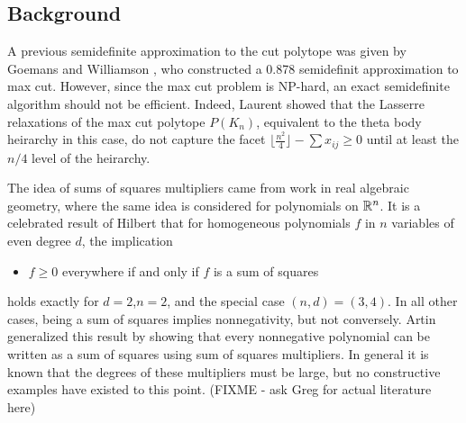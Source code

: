 \subsection{Background}
A previous semidefinite approximation to the cut polytope was given by Goemans and Williamson \cite{who}, who constructed a 0.878 semidefinit approximation to max cut.
However, since the max cut problem is NP-hard, an exact semidefinite algorithm should not be efficient.
Indeed, Laurent \cite{who} showed that the Lasserre relaxations of the max cut polytope $P(K_n)$, equivalent to the theta body heirarchy in this case, do not capture the facet $\lfloor \frac{n^2}{4} \rfloor - \sum x_{ij} \ge 0$ until at least the $n/4$ level of the heirarchy.

The idea of sums of squares multipliers came from work in real algebraic geometry, where the same idea is considered for polynomials on $\mathbb{R}^n$.
It is a celebrated result of Hilbert \cite{hilbert} that for homogeneous polynomials $f$ in $n$ variables of even degree $d$, the implication
\begin{itemize}
\item $f \ge 0$ everywhere if and only if $f$ is a sum of squares
\end{itemize}
holds exactly for $d=2$,$n=2$, and the special case $(n,d)=(3,4)$.
In all other cases, being a sum of squares implies nonnegativity, but not conversely.
Artin \cite{artin} generalized this result by showing that every nonnegative polynomial can be written as a sum of squares using sum of squares multipliers.
In general it is known that the degrees of these multipliers must be large, but no constructive examples have existed to this point. (FIXME - ask Greg for actual literature here)

